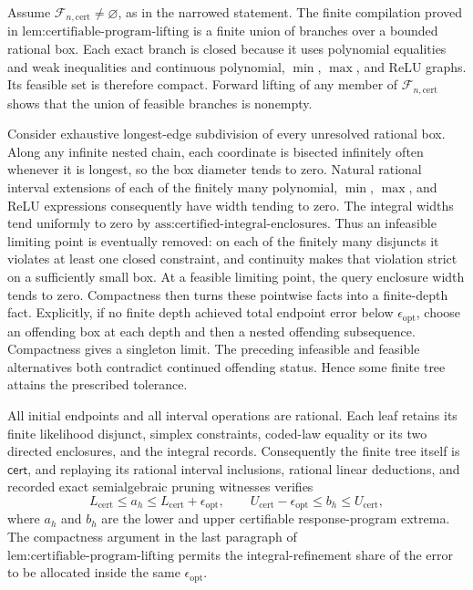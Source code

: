 Assume \(\mathcal F_{n,\mathrm{cert}}\ne\varnothing\), as in the narrowed statement.  The finite compilation proved in \(\text{lem:certifiable-program-lifting}\) is a finite union of branches over a bounded rational box.  Each exact branch is closed because it uses polynomial equalities and weak inequalities and continuous polynomial, \(\min\), \(\max\), and ReLU graphs.  Its feasible set is therefore compact.  Forward lifting of any member of \(\mathcal F_{n,\mathrm{cert}}\) shows that the union of feasible branches is nonempty.

Consider exhaustive longest-edge subdivision of every unresolved rational box.  Along any infinite nested chain, each coordinate is bisected infinitely often whenever it is longest, so the box diameter tends to zero.  Natural rational interval extensions of each of the finitely many polynomial, \(\min\), \(\max\), and ReLU expressions consequently have width tending to zero.  The integral widths tend uniformly to zero by \(\text{ass:certified-integral-enclosures}\).  Thus an infeasible limiting point is eventually removed: on each of the finitely many disjuncts it violates at least one closed constraint, and continuity makes that violation strict on a sufficiently small box.  At a feasible limiting point, the query enclosure width tends to zero.  Compactness then turns these pointwise facts into a finite-depth fact.  Explicitly, if no finite depth achieved total endpoint error below \(\epsilon_{\mathrm{opt}}\), choose an offending box at each depth and then a nested offending subsequence.  Compactness gives a singleton limit.  The preceding infeasible and feasible alternatives both contradict continued offending status.  Hence some finite tree attains the prescribed tolerance.

All initial endpoints and all interval operations are rational.  Each leaf retains its finite likelihood disjunct, simplex constraints, coded-law equality or its two directed enclosures, and the integral records.  Consequently the finite tree itself is \(\mathsf{cert}\), and replaying its rational interval inclusions, rational linear deductions, and recorded exact semialgebraic pruning witnesses verifies
\[
L_{\mathrm{cert}}\leq a_h\leq L_{\mathrm{cert}}+\epsilon_{\mathrm{opt}},
\qquad
U_{\mathrm{cert}}-\epsilon_{\mathrm{opt}}\leq b_h\leq U_{\mathrm{cert}}, \tag{24}
\]
where \(a_h\) and \(b_h\) are the lower and upper certifiable response-program extrema.  The compactness argument in the last paragraph of \(\text{lem:certifiable-program-lifting}\) permits the integral-refinement share of the error to be allocated inside the same \(\epsilon_{\mathrm{opt}}\).

